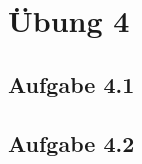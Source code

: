 \documentclass{standalone}
\begin{document}
 
\section{Übung 4}

\subsection{Aufgabe 4.1}

\subsection{Aufgabe 4.2}
\end{document}
